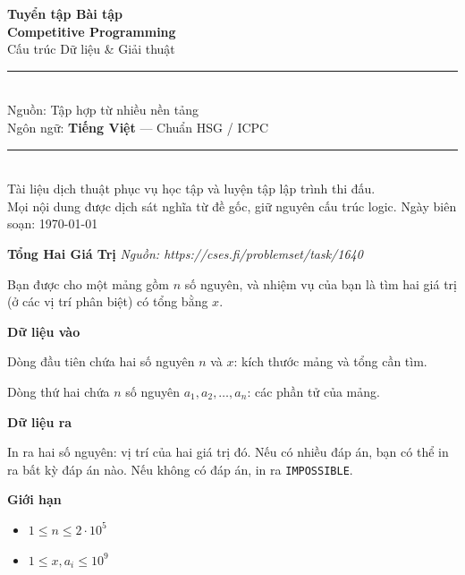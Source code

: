 \documentclass[12pt,a4paper]{article}
\newcommand{\problem}[2]{%
  \begin{mdframed}[
    linecolor=framecolor,
    linewidth=1.5pt,
    backgroundcolor=white,
    topline=true, bottomline=true,
    leftline=true, rightline=true,
    innerleftmargin=10pt, innerrightmargin=10pt,
    innertopmargin=6pt, innerbottommargin=6pt,
  ]
  \textbf{\large #1} \hfill \textit{Nguồn: #2}
  \end{mdframed}
  \vspace{4pt}%
}
\newcommand{\inputformat}{%
  \vspace{6pt}\textbf{\textcolor{sectioncolor}{Dữ liệu vào}}\par\vspace{2pt}%
}
\newcommand{\outputformat}{%
  \vspace{6pt}\textbf{\textcolor{sectioncolor}{Dữ liệu ra}}\par\vspace{2pt}%
}
\newcommand{\constraints}{%
  \vspace{6pt}\textbf{\textcolor{sectioncolor}{Giới hạn}}\par\vspace{2pt}%
}
\begin{document}

\begin{titlepage}
  \centering
  \vspace*{3cm}
  {\Huge\bfseries\color{sectioncolor} Tuyển tập Bài tập\\[0.4em]
   Competitive Programming}\\[0.8em]
  {\large\color{gray} Cấu trúc Dữ liệu \& Giải thuật}\\[2em]
  \rule{\linewidth}{1pt}\\[1.5em]
  {\large Nguồn: Tập hợp từ nhiều nền tảng}\\[0.5em]
  {\large Ngôn ngữ: \textbf{Tiếng Việt} — Chuẩn HSG / ICPC}\\[2em]
  \rule{\linewidth}{1pt}\\[3em]
  {\normalsize\color{gray}
    Tài liệu dịch thuật phục vụ học tập và luyện tập lập trình thi đấu.\\
    Mọi nội dung được dịch sát nghĩa từ đề gốc, giữ nguyên cấu trúc logic.
  }
  \vfill
  {\small\color{gray} Ngày biên soạn: \today}
\end{titlepage}

\tableofcontents
\newpage

\problem{Tổng Hai Giá Trị}{https://cses.fi/problemset/task/1640}

Bạn được cho một mảng gồm $n$ số nguyên, và nhiệm vụ của bạn là tìm hai giá trị (ở các vị trí phân biệt) có tổng bằng $x$.

\inputformat
\begin{inputbox}
Dòng đầu tiên chứa hai số nguyên $n$ và $x$: kích thước mảng và tổng cần tìm.

Dòng thứ hai chứa $n$ số nguyên $a_1, a_2, \dots, a_n$: các phần tử của mảng.
\end{inputbox}

\outputformat
\begin{outputbox}
In ra hai số nguyên: vị trí của hai giá trị đó. Nếu có nhiều đáp án, bạn có thể in ra bất kỳ đáp án nào. Nếu không có đáp án, in ra \texttt{IMPOSSIBLE}.
\end{outputbox}

\constraints
\begin{constraintbox}
\begin{itemize}
    \item $1 \le n \le 2 \cdot 10^5$
    \item $1 \le x, a_i \le 10^9$
\end{itemize}
\end{constraintbox}
\end{document}
